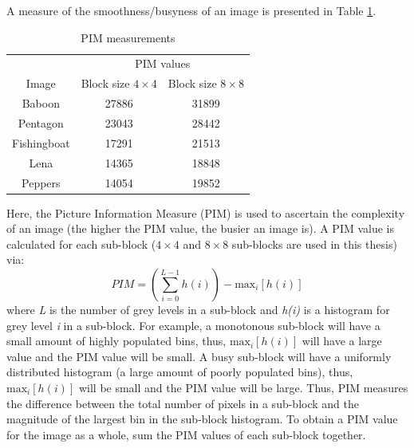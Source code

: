 \documentclass[12pt]{report}
\begin{document}
A measure of the smoothness/busyness of an image is presented
in Table \ref{tab:PIMBKX}. 
\begin{table}[!ht]
\tiny
        \begin{center}
                \begin{tabular}{|c|c|c|} \hline
				& \multicolumn{2}{c|}{PIM values} \\ \cline{2-3}	
		Image		& Block size $4\times 4$	& Block size $8\times 8$ \\ \hline
		Baboon		& 27886			& 31899 \\ \hline 
		Pentagon	& 23043  		& 28442 \\ \hline 
		Fishingboat	& 17291  		& 21513 \\ \hline 
		Lena		& 14365  		& 18848 \\ \hline 
		Peppers		& 14054  		& 19852 \\ \hline 
		\end{tabular}
		\caption{PIM measurements} 
		\label{tab:PIMBKX}
	\end{center}
\end{table}
\normalsize
Here, the Picture Information Measure (PIM) \cite{BKX:shinPIM, BKX:changPIM, mayacheDI} 
is used to ascertain the complexity of an image (the higher the PIM value, the busier an image is).
A PIM value is calculated for each sub-block ($4\times4$ and $8\times8$
sub-blocks are used in this thesis) via:
\begin{equation}
	PIM = \left( \sum^{L-1}_{i=0}h(i) \right) - \mbox{max}_{i}[h(i)]
\end{equation}
where \emph{L} is the number of grey levels in a sub-block and \emph{h(i)} is a histogram for grey level \emph{i} in a sub-block.
For example, a monotonous sub-block will have a small amount of highly populated bins, thus, $\mbox{max}_{i}[h(i)]$ will have a 
large value and the PIM value will be small. A busy sub-block will have a uniformly distributed histogram (a large
amount of poorly populated bins), thus, 
$\mbox{max}_{i}[h(i)]$ will be small and the PIM value will be large. 
Thus, PIM measures the difference between the total number of pixels in a sub-block and the magnitude of the largest bin in the sub-block histogram.
To obtain a PIM value for the image as a whole, sum the PIM values of each sub-block together.
\end{document}
